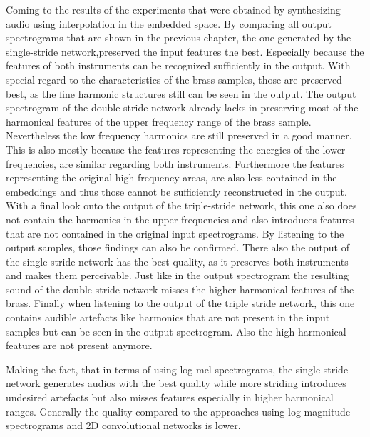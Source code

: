 Coming to the results of the experiments that were obtained by synthesizing audio using interpolation in the embedded space. By comparing all output spectrograms that are shown in the previous chapter, the one generated by the single-stride network,preserved the input features the best. Especially because the features of both instruments can be recognized sufficiently in the output. With special regard to the characteristics of the brass samples, those are preserved best, as the fine harmonic structures still can be seen in the output. The output spectrogram of the double-stride network already lacks in preserving most of the harmonical features of the upper frequency range of the brass sample. Nevertheless the low frequency harmonics are still preserved in a good manner.
This is also mostly because the features representing the energies of the lower frequencies, are similar regarding both instruments. 
Furthermore the features representing the original high-frequency areas, are also less contained in the embeddings and thus those cannot be sufficiently reconstructed in the output. With a final look onto the output of the triple-stride network, this one also does not contain the harmonics in the upper frequencies and also introduces features that are not contained in the original input spectrograms. By listening to the output samples, those findings can also be confirmed. There also the output of the single-stride network has the best quality, as it preserves both instruments and makes them perceivable. Just like in the output spectrogram the resulting sound of the double-stride network misses the higher harmonical features of the brass. Finally when listening to the output of the triple stride network, this one contains audible artefacts like harmonics that are not present in the input samples but can be seen in the output spectrogram. Also the high harmonical features are not present anymore.

Making the fact, that in terms of using log-mel spectrograms, the single-stride network generates audios with the best quality while more striding introduces undesired artefacts but also misses features especially in higher harmonical ranges. Generally the quality compared to the approaches using log-magnitude spectrograms and 2D convolutional networks is lower. 

